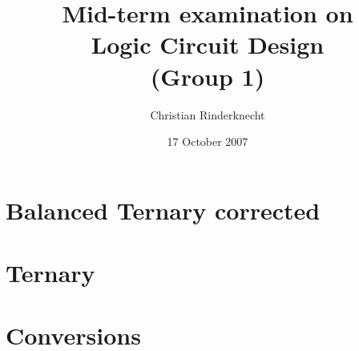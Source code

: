 \documentclass[11pt,a4paper]{article}
\title{Mid-term examination on\\ Logic Circuit Design\\ (Group 1)}
\author{Christian Rinderknecht}
\date{17 October 2007}
\begin{document}
\maketitle
\thispagestyle{empty}

\allowdisplaybreaks

\section{Balanced Ternary corrected}






\section{Ternary}




\section{Conversions}



\end{document}
